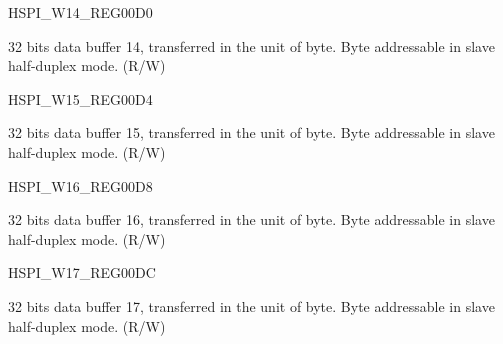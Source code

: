 \begin{register}{H}{SPI\_W14\_REG}{\hexprefix{}00D0}\label{regdesc:SPIW14REG}
%
\regnewline%
\begin{regdesc}\begin{reglist}
\label{fielddesc:SPIBUF14}\item [SPI\_BUF14] 32 bits data buffer 14, transferred in the unit of byte. Byte addressable in slave half-duplex mode. (R/W)
\end{reglist}\end{regdesc}
\end{register}


\begin{register}{H}{SPI\_W15\_REG}{\hexprefix{}00D4}\label{regdesc:SPIW15REG}
%
\regnewline%
\begin{regdesc}\begin{reglist}
\label{fielddesc:SPIBUF15}\item [SPI\_BUF15] 32 bits data buffer 15, transferred in the unit of byte. Byte addressable in slave half-duplex mode. (R/W)
\end{reglist}\end{regdesc}
\end{register}


\begin{register}{H}{SPI\_W16\_REG}{\hexprefix{}00D8}\label{regdesc:SPIW16REG}
%
\regnewline%
\begin{regdesc}\begin{reglist}
\label{fielddesc:SPIBUF16}\item [SPI\_BUF16] 32 bits data buffer 16, transferred in the unit of byte. Byte addressable in slave half-duplex mode. (R/W)
\end{reglist}\end{regdesc}
\end{register}


\begin{register}{H}{SPI\_W17\_REG}{\hexprefix{}00DC}\label{regdesc:SPIW17REG}
%
\regnewline%
\begin{regdesc}\begin{reglist}
\label{fielddesc:SPIBUF17}\item [SPI\_BUF17] 32 bits data buffer 17, transferred in the unit of byte. Byte addressable in slave half-duplex mode. (R/W)
\end{reglist}\end{regdesc}
\end{register}


